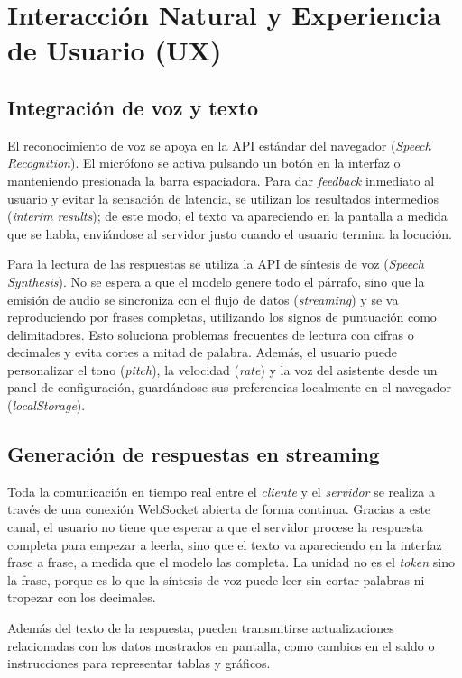 \section{Interacción Natural y Experiencia de Usuario (UX)}

\subsection{Integración de voz y texto}
El reconocimiento de voz se apoya en la API estándar del navegador
(\textit{Speech Recognition}). El micrófono se activa pulsando un 
botón en la interfaz o manteniendo presionada la barra espaciadora. 
Para dar \textit{feedback} inmediato al usuario y evitar la 
sensación de latencia, se utilizan los resultados intermedios 
(\textit{interim results}); de este modo, el texto va apareciendo 
en la pantalla a medida que se habla, enviándose al servidor justo 
cuando el usuario termina la locución.

Para la lectura de las respuestas se utiliza la API de síntesis de 
voz (\textit{Speech Synthesis}). No se espera a que el 
modelo genere todo el párrafo, sino que la emisión de audio se 
sincroniza con el flujo de datos (\textit{streaming}) y se va 
reproduciendo por frases completas, utilizando los signos de puntuación como 
delimitadores. Esto soluciona problemas frecuentes de 
lectura con cifras o decimales y evita cortes a 
mitad de palabra. Además, el usuario puede personalizar el tono 
(\textit{pitch}), la velocidad (\textit{rate}) y la voz del 
asistente desde un panel de configuración, guardándose sus 
preferencias localmente en el navegador (\textit{localStorage}).

\subsection{Generación de respuestas en streaming}

Toda la comunicación en tiempo real entre el \textit{cliente} y 
el \textit{servidor} se realiza a través de una conexión WebSocket 
abierta de forma continua. Gracias a este canal, el usuario no 
tiene que esperar a que el servidor procese la respuesta completa 
para empezar a leerla, sino que el texto va apareciendo en la interfaz
frase a frase, a medida que el modelo las completa. La unidad no es el
\textit{token} sino la frase, porque es lo que la síntesis de voz puede
leer sin cortar palabras ni tropezar con los decimales.

Además del texto de la respuesta, pueden transmitirse 
actualizaciones relacionadas con los datos mostrados en pantalla,
como cambios en el saldo o instrucciones para representar tablas 
y gráficos.

